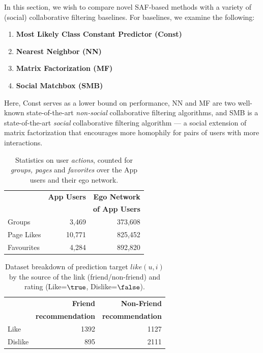 In this section, we wish to compare novel SAF-based methods with a
variety of (social) collaborative filtering baselines.  For baselines,
we examine the following:
\begin{enumerate}
\item {\bf Most Likely Class Constant Predictor (Const)}
\item {\bf Nearest Neighbor (NN)}~\cite{bellkor}
\item {\bf Matrix Factorization (MF)}~\cite{pmf}
\item {\bf Social Matchbox (SMB)}~\cite{Noel2012NOF}
\end{enumerate}
Here, Const serves as a lower bound on performance, NN and MF are two
well-known state-of-the-art \emph{non-social} collaborative filtering
algorithms, and SMB is a state-of-the-art \emph{social} collaborative
filtering algorithm --- a social extension of matrix factorization that
encourages more homophily for pairs of users with more interactions.


\begin{table}[t!]
\centering
\begin{tabular}{|>{\small}l|>{\small}r|>{\small}r|}
\hline
& \textbf{App Users} & \textbf{Ego Network} \\
& & \textbf{of App Users} \\
\hline
Groups & 3,469 & 373,608 \\
\hline
Page Likes & 10,771 & 825,452 \\
\hline
Favourites & 4,284 & 892,820\\
\hline
\end{tabular}
\caption{Statistics on user {\em actions}, counted for {\em groups, pages} and {\em favorites} over the App users and their ego network.}
\label{tab:interests}
\end{table}

\begin{table}[t!]
\centering
\begin{tabular}{|>{\small}l|>{\small}r|>{\small}r|}\hline
&\textbf{Friend}  & \textbf{Non-Friend} \\
&\textbf{recommendation}  & \textbf{recommendation} \\
\hline
Like& 1392 & 1127 \\
\hline
Dislike& 895 & 2111\\
\hline
\end{tabular}
\caption{Dataset breakdown of prediction target $like(u,i)$ by the source of the link (friend/non-friend) and rating (Like=$\true$, Dislike=$\false$).}
\label{tab:likeinfo}
\end{table}


